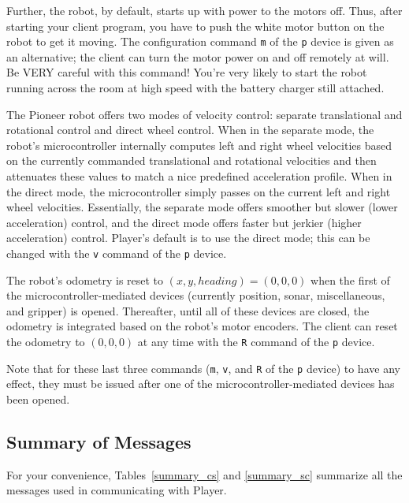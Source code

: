 \documentclass[11pt]{article}
\begin{document}
Further, the robot, by default, starts up with power to the motors off.
Thus, after starting your client program, you have to push the white motor
button on the robot to get it moving.  The configuration command 
{\tt m} of the {\tt p} device is given as an alternative; the client can 
turn the motor
power on and off remotely at will.  Be VERY careful with this command!  
You're very likely to start the robot running across the room at high
speed with the battery charger still attached.

The Pioneer robot offers two modes of velocity control: separate
translational and rotational control and direct wheel control.  When
in the separate mode, the robot's microcontroller internally computes
left and right wheel velocities based on the currently commanded
translational and rotational velocities and then attenuates these values
to match a nice predefined acceleration profile.  When in the direct
mode, the microcontroller simply passes on the current left and right
wheel velocities.  Essentially, the separate mode offers smoother but 
slower (lower acceleration) control, and the direct mode offers faster but 
jerkier (higher acceleration) control.  Player's default is to use the direct
mode; this can be changed with the {\tt v} command of the {\tt p} device.

The robot's odometry is reset to $(x,y,heading) = (0,0,0)$ when the
first of the microcontroller-mediated devices (currently position, sonar,
miscellaneous, and gripper) is opened.  Thereafter, until all of
these devices are closed, the odometry is integrated based on the robot's
motor encoders.  The client can reset the odometry to $(0,0,0)$
at any time with the {\tt R} command of the {\tt p} device.

Note that for these last three commands ({\tt m}, {\tt v}, and {\tt R} of the
{\tt p} device) to have any 
effect, they must be issued after one of the microcontroller-mediated
devices has been opened.

\subsection{Summary of Messages}
For your convenience, Tables~\ref{summary_cs} and \ref{summary_sc}
summarize all the messages used in communicating with Player.
\end{document}
